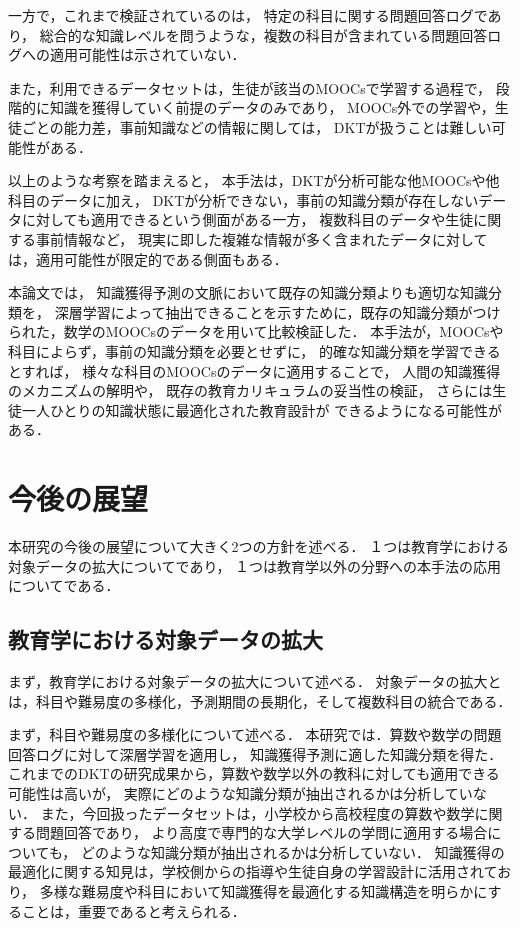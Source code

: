 一方で，これまで検証されているのは，
特定の科目に関する問題回答ログであり，
総合的な知識レベルを問うような，複数の科目が含まれている問題回答ログへの適用可能性は示されていない．

また，利用できるデータセットは，生徒が該当のMOOCsで学習する過程で，
段階的に知識を獲得していく前提のデータのみであり，
MOOCs外での学習や，生徒ごとの能力差，事前知識などの情報に関しては，
DKTが扱うことは難しい可能性がある．


以上のような考察を踏まえると，
本手法は，DKTが分析可能な他MOOCsや他科目のデータに加え，
DKTが分析できない，事前の知識分類が存在しないデータに対しても適用できるという側面がある一方，
複数科目のデータや生徒に関する事前情報など，
現実に即した複雑な情報が多く含まれたデータに対しては，適用可能性が限定的である側面もある．


本論文では，
知識獲得予測の文脈において既存の知識分類よりも適切な知識分類を，
深層学習によって抽出できることを示すために，既存の知識分類がつけられた，数学のMOOCsのデータを用いて比較検証した．
本手法が，MOOCsや科目によらず，事前の知識分類を必要とせずに，
的確な知識分類を学習できるとすれば，
様々な科目のMOOCsのデータに適用することで，
人間の知識獲得のメカニズムの解明や，
既存の教育カリキュラムの妥当性の検証，
さらには生徒一人ひとりの知識状態に最適化された教育設計が
できるようになる可能性がある．




\section{今後の展望}
本研究の今後の展望について大きく2つの方針を述べる．
１つは教育学における対象データの拡大についてであり，
１つは教育学以外の分野への本手法の応用についてである．


\subsection{教育学における対象データの拡大}
まず，教育学における対象データの拡大について述べる．
対象データの拡大とは，科目や難易度の多様化，予測期間の長期化，そして複数科目の統合である．


まず，科目や難易度の多様化について述べる．
本研究では．算数や数学の問題回答ログに対して深層学習を適用し，
知識獲得予測に適した知識分類を得た．
これまでのDKTの研究成果から，算数や数学以外の教科に対しても適用できる可能性は高いが，
実際にどのような知識分類が抽出されるかは分析していない．
また，今回扱ったデータセットは，小学校から高校程度の算数や数学に関する問題回答であり，
より高度で専門的な大学レベルの学問に適用する場合についても，
どのような知識分類が抽出されるかは分析していない．
知識獲得の最適化に関する知見は，学校側からの指導や生徒自身の学習設計に活用されており，
多様な難易度や科目において知識獲得を最適化する知識構造を明らかにすることは，重要であると考えられる．



